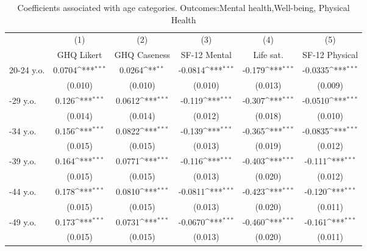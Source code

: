 \begin{table}[htbp]\centering
\def\sym#1{\ifmmode^{#1}\else\(^{#1}\)\fi}
\caption{Coefficients associated with age categories. Outcomes:Mental health,Well-being, Physical Health\label{tab6}}
\begin{tabular}{l*{5}{c}}
\toprule
                &\multicolumn{1}{c}{(1)}&\multicolumn{1}{c}{(2)}&\multicolumn{1}{c}{(3)}&\multicolumn{1}{c}{(4)}&\multicolumn{1}{c}{(5)}\\
                &\multicolumn{1}{c}{GHQ Likert}&\multicolumn{1}{c}{GHQ Caseness}&\multicolumn{1}{c}{SF-12 Mental}&\multicolumn{1}{c}{Life sat.}&\multicolumn{1}{c}{SF-12 Physical}\\
\midrule
20-24 y.o.      &   0.0704\sym{***}&   0.0264\sym{**} &  -0.0814\sym{***}&   -0.179\sym{***}&  -0.0335\sym{***}\\
                &  (0.010)         &  (0.010)         &  (0.010)         &  (0.013)         &  (0.009)         \\
\addlinespace
25-29 y.o.      &    0.126\sym{***}&   0.0612\sym{***}&   -0.119\sym{***}&   -0.307\sym{***}&  -0.0510\sym{***}\\
                &  (0.014)         &  (0.014)         &  (0.012)         &  (0.018)         &  (0.010)         \\
\addlinespace
30-34 y.o.      &    0.156\sym{***}&   0.0822\sym{***}&   -0.139\sym{***}&   -0.365\sym{***}&  -0.0835\sym{***}\\
                &  (0.015)         &  (0.015)         &  (0.013)         &  (0.019)         &  (0.012)         \\
\addlinespace
35-39 y.o.      &    0.164\sym{***}&   0.0771\sym{***}&   -0.116\sym{***}&   -0.403\sym{***}&   -0.111\sym{***}\\
                &  (0.015)         &  (0.015)         &  (0.013)         &  (0.020)         &  (0.012)         \\
\addlinespace
40-44 y.o.      &    0.178\sym{***}&   0.0810\sym{***}&  -0.0811\sym{***}&   -0.423\sym{***}&   -0.120\sym{***}\\
                &  (0.015)         &  (0.015)         &  (0.013)         &  (0.020)         &  (0.011)         \\
\addlinespace
45-49 y.o.      &    0.173\sym{***}&   0.0731\sym{***}&  -0.0670\sym{***}&   -0.460\sym{***}&   -0.161\sym{***}\\
                &  (0.015)         &  (0.015)         &  (0.013)         &  (0.020)         &  (0.011)         \\

\end{tabular}
\end{table}
